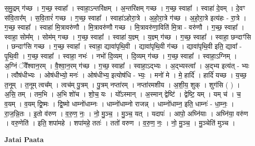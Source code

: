 \documentclass[17pt]{extarticle}
\begin{document}
स॒मु॒द्रम् ग॑च्छ । ग॒च्छ॒ स्वाहा᳚ । स्वाहा॒ऽन्तरि॑क्षम् । अ॒न्तरि॑क्षम् गच्छ । ग॒च्छ॒ स्वाहा᳚ । स्वाहा॑ दे॒वम् । दे॒वꣳ स॑वि॒तार᳚म् । स॒वि॒तारं॑ गच्छ । ग॒च्छ॒ स्वाहा᳚ । स्वाहा॑ऽहोरा॒त्रे । अ॒हो॒रा॒त्रे ग॑च्छ । अ॒हो॒रा॒त्रे इत्य॑हः - रा॒त्रे । ग॒च्छ॒ स्वाहा᳚ । स्वाहा॑ मि॒त्रावरु॑णौ । मि॒त्रावरु॑णौ गच्छ । मि॒त्रावरु॑णा॒विति॑ मि॒त्रा - वरु॑णौ । ग॒च्छ॒ स्वाहा᳚ । स्वाहा॒ सोम᳚म् । सोम॑म् गच्छ । ग॒च्छ॒ स्वाहा᳚ । स्वाहा॑ य॒ज्ञ्म् । य॒ज्ञ्म् ग॑च्छ । ग॒च्छ॒ स्वाहा᳚ । स्वाहा॒ छन्दाꣳ॑सि । छन्दाꣳ॑सि गच्छ । ग॒च्छ॒ स्वाहा᳚ । स्वाहा॒ द्यावा॑पृथि॒वी । द्यावा॑पृथि॒वी ग॑च्छ । द्यावा॑पृथि॒वी इति॒ द्यावा᳚ - पृ॒थि॒वी । ग॒च्छ॒ स्वाहा᳚ । स्वाहा॒ नभः॑ । नभो॑ दि॒व्यम् । दि॒व्यम् ग॑च्छ । ग॒च्छ॒ स्वाहा᳚ । स्वाहा॒ऽग्निम् । अ॒ग्निं ॅवै᳚श्वान॒रम् । वै॒श्वा॒न॒रम् ग॑च्छ । ग॒च्छ॒ स्वाहा᳚ । स्वाहा॒ऽद्भ्यः । अ॒द्भ्यस्त्वा᳚ । अ॒द्भ्य इत्य॑त् - भ्यः । त्वौष॑धीभ्यः । ओष॑धीभ्यो॒ मनः॑ । ओष॑धीभ्य॒ इत्योष॑धि - भ्यः॒ । मनो॑ मे । मे॒ हार्दि॑ । हार्दि॑ यच्छ । य॒च्छ॒ त॒नूम् । त॒नूम् त्वच᳚म् । त्वच॑म् पु॒त्रम् । पु॒त्रम् नप्ता॑रम् । नप्ता॑रमशीय । अ॒शी॒य॒ शुक् । शुग॑सि ( ) । अ॒सि॒ तम् । तम॒भि । अ॒भि शो॑च । शो॒च॒ यः । यो᳚ऽस्मान् । अ॒स्मान् द्वेष्टि॑ । द्वेष्टि॒ यम् । यम् च॑ । च॒ व॒यम् । व॒यम् द्वि॒ष्मः । द्वि॒ष्मो धाम्नो॑धाम्नः । धाम्नो॑धाम्नो राजन्न् । धाम्नो॑धाम्न॒ इति॒ धाम्नः॑ - धा॒म्नः॒ । रा॒ज॒न्नि॒तः । इ॒तो व॑रुण । व॒रु॒ण॒ नः॒ । नो॒ मु॒ञ्च॒ । मु॒ञ्च॒ यत् । यदापः॑ । आपो॒ अघ्नि॑याः । अघ्नि॑या॒ वरु॑ण । वरु॒णेति॑ । इति॒ शपा॑महे । शपा॑महे॒ ततः॑ । ततो॑ वरुण । व॒रु॒ण॒ नः॒ । नो॒ मु॒ञ्च॒ । मु॒ञ्चेति॑ मुञ्च । \newline

\textbf{Jatai Paata} \newline
\end{document}
